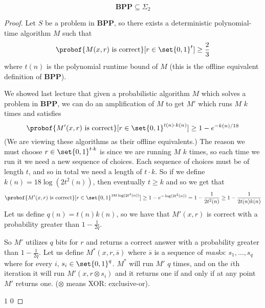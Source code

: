 \documentclass[10pt]{article}
\def\BPP{\mathbf{BPP}}
\begin{document}
\begin{thrm*}

    \[ \BPP \subseteq \Sigma_2 \]

\end{thrm*}

\begin{proof}

    Let $S$ be a problem in $\BPP$, so there exists a deterministic polynomial-time algorithm $M$ such that
    \[ \probof{M(x,r)\text{ is correct}}[r\in\set{0,1}^t] \geq \frac23 \]
    where $t(n)$ is the polynomial runtime bound of $M$ (this is the offline equivalent definition of $\BPP$).

    We showed last lecture that given a probabilistic algorithm $M$ which solves a problem in $\BPP$, we can do an amplification of $M$ to get $M'$ which runs $M$ $k$ times and satisfies
    \[ \probof{M'(x,r)\text{ is correct}}[r\in\set{0,1}^{t(n)\cdot k(n)}] \geq 1-e^{-k(n)/18} \]
    (We are viewing these algorithms as their offline equivalents.)
    The reason we must choose $r\in\set{0,1}^{t\cdot k}$ is since we are running $M$ $k$ times, so each time we run it we need a new sequence of choices.
    Each sequence of choices must be of length $t$, and so in total we need a length of $t\cdot k$.
    So if we define $k(n)=18\log(2t^2(n))$, then eventually $t\geq k$ and so we get that 
    \[ \probof{M'(x,r)\text{ is correct}}[r\in\set{0,1}^{18t\log(2t^2(n))}] \geq 1-e^{-\log(2t^2(n))} = 1-\frac1{2t^2(n)} \geq 1-\frac1{2t(n)k(n)} \]
    Let us define $q(n)=t(n)k(n)$, so we have that $M'(x,r)$ is correct with a probability greater than $1-\frac1{2q}$.

    So $M'$ utilizes $q$ bits for $r$ and returns a correct answer with a probability greater than $1-\frac1{2q}$.
    Let us define $M^*(x,r,\overline s)$ where $\overline s$ is a sequence of \emph{masks}: $s_1,\dots,s_q$ where for every $i$, $s_i\in\set{0,1}^q$.
    $M^*$ will run $M'$ $q$ times, and on the $i$th iteration it will run $M'(x,r\otimes s_i)$ and it returns one if and only if at any point $M'$ returns one.
    ($\otimes$ means XOR: exclusive-or).

    \algorithm
                 \Return $1$
            \EndFor
            \State\Return $0$
        \EndFunc
    \ealgorithm


\end{proof}
\end{document}

